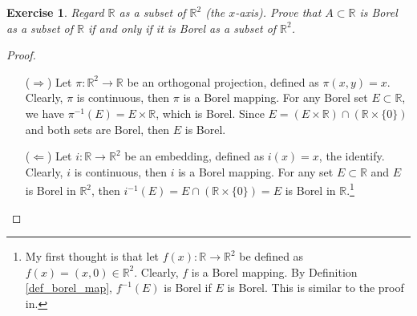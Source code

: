 \documentclass[11pt]{book}
\newtheorem{exercise}{Exercise}[chapter]
\theoremstyle{definition}
\numberwithin{equation}{chapter}
\begin{document}
\begin{exercise}\label{exe_120}
Regard $\mathbb{R}$ as a subset of $\mathbb{R}^2$ (the $x$-axis). Prove that $A\subset\mathbb{R}$ is Borel as a subset of $\mathbb{R}$ if and only if it is Borel as a subset of $\mathbb{R}^2$.
\end{exercise}
\begin{proof}
~\begin{enumerate}
    \item[($\Rightarrow$)] Let $\pi:\mathbb{R}^2 \to \mathbb{R}$ be an orthogonal projection, defined as $\pi(x,y) = x$. Clearly, $\pi$ is continuous, then $\pi$ is a Borel mapping. For any Borel set $E \subset \mathbb{R}$, we have $\pi^{-1}(E) = E \times \mathbb{R}$, which is Borel. Since $E = (E \times \mathbb{R}) \cap (\mathbb{R} \times \{0\})$ and both sets are Borel, then $E$ is Borel.
    
    \item[($\Leftarrow$)] Let $i:\mathbb{R} \to \mathbb{R}^2$ be an embedding, defined as $i(x) = x$, the identify. Clearly, $i$ is continuous, then $i$ is a Borel mapping. For any set $E \subset \mathbb{R}$ and $E$ is Borel in $\mathbb{R}^2$, then $i^{-1}(E) = E \cap (\mathbb{R} \times \{0\}) = E$ is Borel in $\mathbb{R}$.\footnote{My first thought is that let $f(x): \mathbb{R} \to \mathbb{R}^2$ be defined as $f(x) = (x,0) \in \mathbb{R}^2$. Clearly, $f$ is a Borel mapping. By Definition \ref{def_borel_map}, $f^{-1}(E)$ is Borel if $E$ is Borel. This is similar to the proof in\cite{23}.}
\end{enumerate}
\end{proof}
\end{document}
